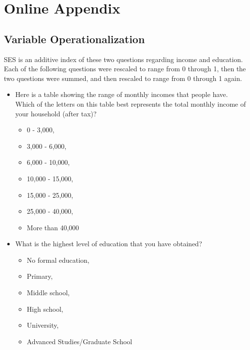 \documentclass[]{interact}
\theoremstyle{plain}%
\theoremstyle{definition}
\theoremstyle{remark}
\begin{document}
\newpage{}

\hypertarget{online-appendix}{%
\section{Online Appendix}\label{online-appendix}}

\hypertarget{variable-operationalization}{%
\subsection{Variable
Operationalization}\label{variable-operationalization}}

SES is an additive index of these two questions regarding income and
education. Each of the following questions were rescaled to range from 0
through 1, then the two questions were summed, and then rescaled to
range from 0 through 1 again.

\begin{itemize}
\item
  Here is a table showing the range of monthly incomes that people have.
  Which of the letters on this table best represents the total monthly
  income of your household (after tax)?

  \begin{itemize}
  \item
    0 - 3,000,
  \item
    3,000 - 6,000,
  \item
    6,000 - 10,000,
  \item
    10,000 - 15,000,
  \item
    15,000 - 25,000,
  \item
    25,000 - 40,000,
  \item
    More than 40,000
  \end{itemize}
\item
  What is the highest level of education that you have obtained?

  \begin{itemize}
  \item
    No formal education,
  \item
    Primary,
  \item
    Middle school,
  \item
    High school,
  \item
    University,
  \item
    Advanced Studies/Graduate School
  \end{itemize}
\end{itemize}
\end{document}
